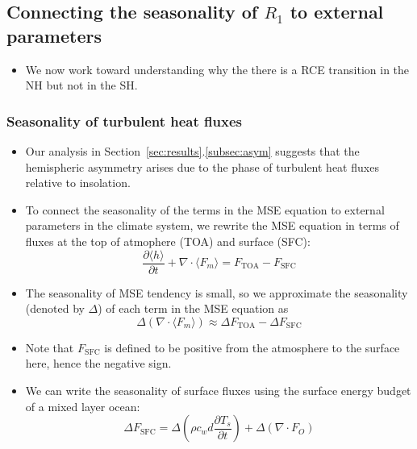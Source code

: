 \documentclass{ametsocV5}
\begin{document}
\subsection{Connecting the seasonality of \(R_{1}\) to external parameters}
\begin{itemize}
  \item We now work toward understanding why the there is a RCE transition in the NH but not in the SH.
\end{itemize}

        \subsubsection{Seasonality of turbulent heat fluxes}
        \begin{itemize}
          \item Our analysis in Section~\ref{sec:results}.\ref{subsec:asym} suggests that the hemispheric asymmetry arises due to the phase of turbulent heat fluxes relative to insolation.
          \item To connect the seasonality of the terms in the MSE equation to external parameters in the climate system, we rewrite the MSE equation in terms of fluxes at the top of atmophere (TOA) and surface (SFC):
                \begin{equation}\label{eq:mse-toasfc}
                  \frac{\partial \langle h \rangle}{\partial t} + \nabla\cdot \langle F_{m} \rangle = F_{\mathrm{TOA}} - F_{\mathrm{SFC}}
                \end{equation}
          \item The seasonality of MSE tendency is small, so we approximate the seasonality (denoted by $\Delta$) of each term in the MSE equation as
                \begin{equation}\label{eq:mse-toasfc-approx}
                  \Delta (\nabla\cdot \langle F_{m} \rangle) \approx \Delta F_{\mathrm{TOA}} - \Delta F_{\mathrm{SFC}}
                \end{equation}
          \item Note that \(F_{\mathrm{SFC}}\) is defined to be positive from the atmosphere to the surface here, hence the negative sign.
          \item We can write the seasonality of surface fluxes using the surface energy budget of a mixed layer ocean:
                \begin{equation}
                  \Delta F_{\mathrm{SFC}} = \Delta\left(\rho c_{w} d \frac{\partial T_{s}}{\partial t}\right) + \Delta ( \nabla\cdot F_{O})

\end{equation}
\end{itemize}
\end{document}
